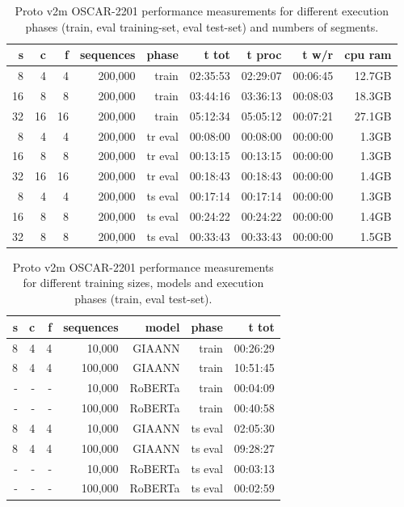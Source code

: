 \begin{table}[H]
\centering
\caption{Proto v2m OSCAR-2201 performance measurements for different execution phases (train, eval training-set, eval test-set) and numbers of segments.}
\label{tab:protov2m-oscar-performance-segmentSizes-inferenceLeakyIntegrateAndFire}
\begin{tabular}{rrrrrrrrr}
\toprule
\textbf{s} & \textbf{c} & \textbf{f} & \textbf{sequences} & \textbf{phase} & \textbf{t tot} & \textbf{t proc} & \textbf{t w/r} & \textbf{cpu ram} \\
\midrule
8 & 4 & 4 & 200,000     & train   & 02:35:53 & 02:29:07 & 00:06:45 & 12.7GB \\
16 & 8 & 8 & 200,000    & train   & 03:44:16 & 03:36:13 & 00:08:03 & 18.3GB \\
32 & 16 & 16 & 200,000  & train   & 05:12:34 & 05:05:12 & 00:07:21 & 27.1GB \\
8 & 4 & 4 & 200,000     & tr eval & 00:08:00 & 00:08:00 & 00:00:00 & 1.3GB \\
16 & 8 & 8 & 200,000    & tr eval & 00:13:15 & 00:13:15 & 00:00:00 & 1.3GB \\
32 & 16 & 16 & 200,000  & tr eval & 00:18:43 & 00:18:43 & 00:00:00 & 1.4GB \\
8 & 4 & 4 & 200,000     & ts eval & 00:17:14 & 00:17:14 & 00:00:00 & 1.3GB \\
16 & 8 & 8 & 200,000    & ts eval & 00:24:22 & 00:24:22 & 00:00:00 & 1.4GB \\
32 & 8 & 8 & 200,000    & ts eval & 00:33:43 & 00:33:43 & 00:00:00 & 1.5GB \\
\bottomrule
\end{tabular}
\end{table}

\begin{table}[H]
\centering
\caption{Proto v2m OSCAR-2201 performance measurements for different training sizes, models and execution phases (train, eval test-set).}
\label{tab:protov2m-oscar-performance-models-inferenceLeakyIntegrateAndFire}
\begin{tabular}{rrrrrrr}
\toprule
\textbf{s} & \textbf{c} & \textbf{f} & \textbf{sequences} & \textbf{model} & \textbf{phase} & \textbf{t tot} \\
\midrule
8 & 4 & 4 & 10,000  & GIAANN  & train   & 00:26:29 \\
8 & 4 & 4 & 100,000 & GIAANN  & train   & 10:51:45 \\
- & - & - & 10,000  & RoBERTa & train   & 00:04:09 \\
- & - & - & 100,000 & RoBERTa & train   & 00:40:58 \\
8 & 4 & 4 & 10,000  & GIAANN  & ts eval & 02:05:30 \\
8 & 4 & 4 & 100,000 & GIAANN  & ts eval & 09:28:27 \\
- & - & - & 10,000  & RoBERTa & ts eval & 00:03:13 \\
- & - & - & 100,000 & RoBERTa & ts eval & 00:02:59 \\
\bottomrule
\end{tabular}
\end{table}


